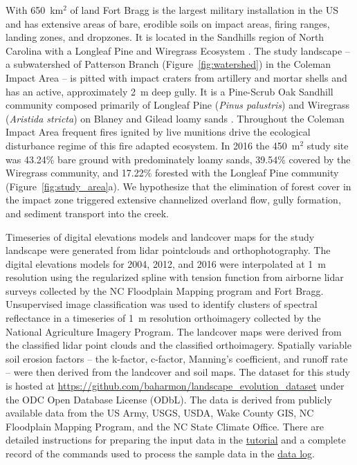 \documentclass[gmd, manuscript]{copernicus}
\begin{document}
With 650~\unit{km}$^{2}$ of land
Fort Bragg is the largest military installation in the US
and has extensive areas of bare, erodible soils
on impact areas, firing ranges, landing zones, and dropzones. 
It is located in the Sandhills region of North Carolina 
with a Longleaf Pine and Wiregrass Ecosystem \citep{Sorrie2006}.
%
The study landscape 
-- a subwatershed of Patterson Branch (Figure~\ref{fig:watershed}) 
in the Coleman Impact Area --
is pitted with impact craters from artillery and mortar shells
and has an active, approximately 2~\unit{m} deep gully. 
%
It is a Pine-Scrub Oak Sandhill community
composed primarily of Longleaf Pine (\emph{Pinus palustris})
and Wiregrass (\emph{Aristida stricta})
on Blaney and Gilead loamy sands 
\citep{Sorrie2004}. 
%
Throughout the Coleman Impact Area
frequent fires ignited by live munitions
drive the ecological disturbance regime
of this fire adapted ecosystem.
%
In 2016 the  450~\unit{m}$^{2}$ study site was
43.24\% bare ground with predominately loamy sands,
39.54\% covered by the Wiregrass community, and
17.22\% forested with the Longleaf Pine community 
(Figure~\ref{fig:study_area}a). 
%
We hypothesize that the elimination of forest cover
in the impact zone
triggered extensive channelized overland flow,
gully formation, and sediment transport into the creek. 

Timeseries of digital elevations models 
and landcover maps for the study landscape
were generated from lidar pointclouds and orthophotography.
The digital elevations models for 2004, 2012, and 2016
were interpolated at 1~\unit{m} resolution
using the regularized spline with tension function \citep{Mitasova1993,Mitasova2005}
from airborne lidar surveys 
collected by the NC Floodplain Mapping program and Fort Bragg. 
%
Unsupervised image classification 
was used to identify clusters of spectral reflectance
in a timeseries of 1~\unit{m} resolution orthoimagery 
collected by the National Agriculture Imagery Program.
The landcover maps were derived from the
classified lidar point clouds and the classified orthoimagery.
Spatially variable soil erosion factors 
-- the k-factor, c-factor, Manning's coefficient, and runoff rate --
were then derived from the landcover and soil maps.
The dataset for this study is hosted at 
\url{https://github.com/baharmon/landscape\_evolution_dataset}
under the ODC Open Database License (ODbL).
The data is derived from publicly available data from
the US Army, USGS, USDA, Wake County GIS, NC Floodplain
Mapping Program, and the NC State Climate Office.
There are detailed instructions for preparing the input data in the 
\href{https://github.com/baharmon/landscape_evolution/blob/master/tutorial.md}{tutorial}
and a complete record of the commands used to process the sample data in the
\href{https://github.com/baharmon/landscape_evolution_dataset/blob/master/nc_spm_evolution/DATA.md}{data log}.
\end{document}
